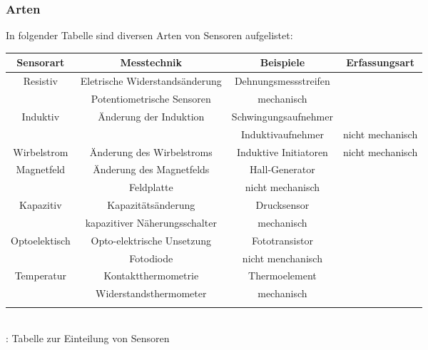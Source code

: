 \documentclass{article}
\begin{document}
				\subsubsection{Arten}
				In folgender Tabelle sind diversen Arten von Sensoren aufgelistet:
				
				\begin{tabular}{c|c|c|c}
					
					\hline
					\textbf {Sensorart} & \textbf{Messtechnik} & \textbf {Beispiele} & \textbf{Erfassungsart}\\
					\hline
					
					Resistiv & Eletrische Widerstandsänderung & Dehnungsmessstreifen \\
					& Potentiometrische Sensoren &  mechanisch\\
					
					
					\hline
					Induktiv & Änderung der Induktion & Schwingungsaufnehmer \\
					&& Induktivaufnehmer & nicht mechanisch\\
					\hline
					
					Wirbelstrom & Änderung des Wirbelstroms & Induktive Initiatoren & nicht mechanisch\\
					\hline
					
					Magnetfeld & Änderung des Magnetfelds & Hall-Generator\\
					& Feldplatte & nicht mechanisch\\
					\hline
					
					Kapazitiv & Kapazitätsänderung & Drucksensor\\
					& kapazitiver Näherungsschalter & mechanisch\\
					\hline
					
					Optoelektisch & Opto-elektrische Unsetzung & Fototransistor\\
					& Fotodiode & nicht menchanisch \\
					\hline
					
					Temperatur & Kontaktthermometrie & Thermoelement\\
					& Widerstandsthermometer & mechanisch\\
					\hline}
								
					\end{tabular}
					\\

					\caption{ \cite{TS02}: Tabelle zur Einteilung von Sensoren}\\
				
\end{document}
